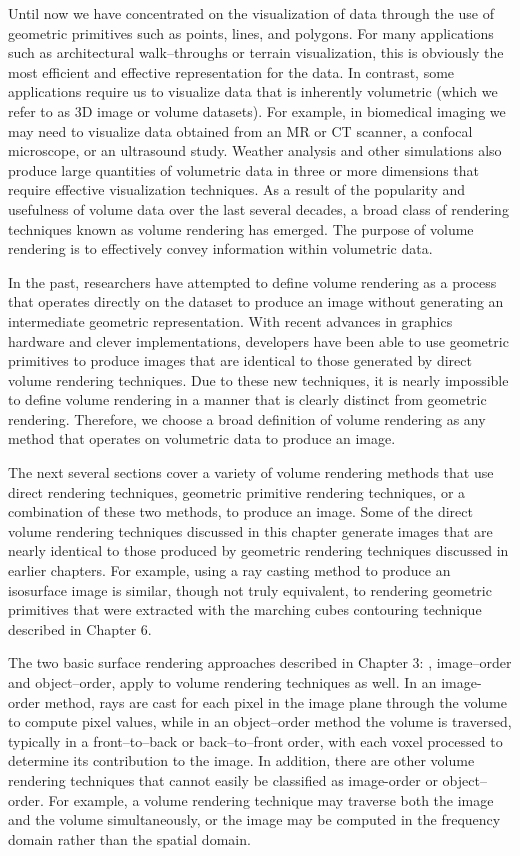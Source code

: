 Until now we have concentrated on the visualization of data through the use of geometric primitives such as points, lines, and polygons.
For many applications such as architectural walk--throughs or terrain visualization, this is obviously the most efficient and effective representation for the data.
In contrast, some applications require us to visualize data that is inherently volumetric (which we refer to as 3D image or volume datasets).
For example, in biomedical imaging we may need to visualize data obtained from an MR or CT scanner, a confocal microscope, or an ultrasound study.
Weather analysis and other simulations also produce large quantities of volumetric data in three or more dimensions that require effective visualization techniques.
As a result of the popularity and usefulness of volume data over the last several decades, a broad class of rendering techniques known as volume rendering has emerged. The purpose of volume rendering is to effectively convey information within volumetric data.

In the past, researchers have attempted to define volume rendering as a process that operates directly on the dataset to produce an image without generating an intermediate geometric representation. With recent advances in graphics hardware and clever implementations, developers have been able to use geometric primitives to produce images that are identical to those generated by direct volume rendering techniques. Due to these new techniques, it is nearly impossible to define volume rendering in a manner that is clearly distinct from geometric rendering. Therefore, we choose a broad definition of volume rendering as any method that operates on volumetric data to produce an image.

The next several sections cover a variety of volume rendering methods that use direct rendering techniques, geometric primitive rendering techniques, or a combination of these two methods, to produce an image. Some of the direct volume rendering techniques discussed in this chapter generate images that are nearly identical to those produced by geometric rendering techniques discussed in earlier chapters. For example, using a ray casting method to produce an isosurface image is similar, though not truly equivalent, to rendering geometric primitives that were extracted with the marching cubes contouring technique described in Chapter 6.

The two basic surface rendering approaches described in Chapter 3: , image--order and object--order, apply to volume rendering techniques as well. In an image-order method, rays are cast for each pixel in the image plane through the volume to compute pixel values, while in an object--order method the volume is traversed, typically in a front--to--back or back--to--front order, with each voxel processed to determine its contribution to the image. In addition, there are other volume rendering techniques that cannot easily be classified as image-order or object--order. For example, a volume rendering technique may traverse both the image and the volume simultaneously, or the image may be computed in the frequency domain rather than the spatial domain.

